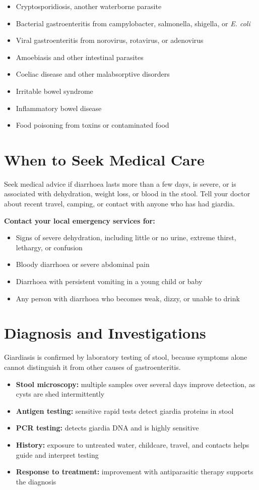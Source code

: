 \begin{itemize}
    \item Cryptosporidiosis, another waterborne parasite
    \item Bacterial gastroenteritis from campylobacter, salmonella, shigella, or \textit{E. coli}
    \item Viral gastroenteritis from norovirus, rotavirus, or adenovirus
    \item Amoebiasis and other intestinal parasites
    \item Coeliac disease and other malabsorptive disorders
    \item Irritable bowel syndrome
    \item Inflammatory bowel disease
    \item Food poisoning from toxins or contaminated food
\end{itemize}

\section*{When to Seek Medical Care}
Seek medical advice if diarrhoea lasts more than a few days, is severe, or is associated with dehydration, weight loss, or blood in the stool. Tell your doctor about recent travel, camping, or contact with anyone who has had giardia.

\textbf{Contact your local emergency services for:}
\begin{itemize}
    \item Signs of severe dehydration, including little or no urine, extreme thirst, lethargy, or confusion
    \item Bloody diarrhoea or severe abdominal pain
    \item Diarrhoea with persistent vomiting in a young child or baby
    \item Any person with diarrhoea who becomes weak, dizzy, or unable to drink
\end{itemize}

\section*{Diagnosis and Investigations}
Giardiasis is confirmed by laboratory testing of stool, because symptoms alone cannot distinguish it from other causes of gastroenteritis.

\begin{itemize}
    \item \textbf{Stool microscopy:} multiple samples over several days improve detection, as cysts are shed intermittently
    \item \textbf{Antigen testing:} sensitive rapid tests detect giardia proteins in stool
    \item \textbf{PCR testing:} detects giardia DNA and is highly sensitive
    \item \textbf{History:} exposure to untreated water, childcare, travel, and contacts helps guide and interpret testing
    \item \textbf{Response to treatment:} improvement with antiparasitic therapy supports the diagnosis
\end{itemize}

